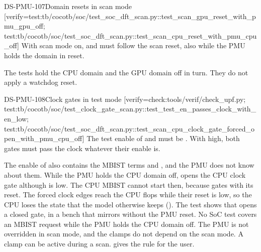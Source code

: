\begin{requirement}{DS-PMU-107}{Domain resets in scan mode}
[verify={test:tb/cocotb/soc/test_soc_dft_scan.py::test_scan_gpu_reset_with_pmu_gpu_off; test:tb/cocotb/soc/test_soc_dft_scan.py::test_scan_cpu_reset_with_pmu_cpu_off}]
With scan mode on,  and  must follow the scan reset, also while the PMU holds the domain in reset.
\end{requirement}
\begin{information}
The tests hold the CPU domain and the GPU domain off in turn. They do not apply a watchdog reset.
\end{information}

\begin{requirement}{DS-PMU-108}{Clock gates in test mode}
[verify={check:tools/verif/check_upf.py; test:tb/cocotb/soc/test_clock_gate_scan.py::test_test_en_passes_clock_with_en_low; test:tb/cocotb/soc/test_soc_dft_scan.py::test_scan_cpu_clock_gate_forced_open_with_pmu_cpu_off}]
The test enable of  and  must be . With  high, both gates must pass the clock whatever their enable is.
\end{requirement}
\begin{information}
The enable of  also contains the MBIST terms  and , and the PMU does not know about them. While the PMU holds the CPU domain off,  opens the CPU clock gate although  is low. The CPU MBIST cannot start then, because  gates  with its reset. The forced clock edges reach the CPU flops while their reset is low, so the CPU loses the state that the model otherwise keeps (). The test  shows that  opens a closed gate, in a bench that mirrors  without the PMU reset. No SoC test covers an MBIST request while the PMU holds the CPU domain off. The PMU is not overridden in scan mode, and the clamps do not depend on the scan mode. A clamp can be active during a scan.  gives the rule for the user.
\end{information}
